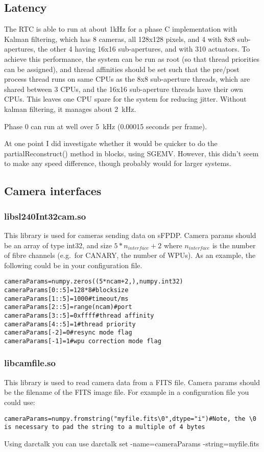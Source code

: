 \documentclass[a4,10pt]{article}
\begin{document}
\subsection{Latency}
The RTC is able to run at about 1kHz for a phase C implementation with
Kalman filtering, which
has 8 cameras, all 128x128 pixels, and 4 with 8x8 sub-apertures, the
other 4 having 16x16 sub-apertures, and with 310 actuators.  To
achieve this performance, the system can be run as root (so that
thread priorities can be assigned), and thread affinities should be
set such that the pre/post process thread runs on same CPUs as the 8x8
sub-aperture threads, which are shared between 3 CPUs, and the 16x16
sub-aperture threads have their own CPUs.  This leaves one CPU spare
for the system for reducing jitter.  Without kalman filtering, it
manages about 2~kHz.

Phase 0 can run at well over 5~kHz (0.00015 seconds per frame).

At one point I did investigate whether it would be quicker to do the
partialReconstruct() method in blocks, using SGEMV.  However, this
didn't seem to make any speed difference, though probably would for larger systems.

\subsection{Camera interfaces}
\subsubsection{libsl240Int32cam.so}
This library is used for cameras sending data on sFPDP.  Camera params
should be an array of type int32, and size $5*n_{interface}+2$ where
$n_{interface}$ is the number of fibre channels (e.g.\ for CANARY, the
number of WPUs).  As an example, the following could be in your
configuration file.
\begin{verbatim}
cameraParams=numpy.zeros((5*ncam+2,),numpy.int32)
cameraParams[0::5]=128*8#blocksize
cameraParams[1::5]=1000#timeout/ms
cameraParams[2::5]=range(ncam)#port
cameraParams[3::5]=0xffff#thread affinity
cameraParams[4::5]=1#thread priority
cameraParams[-2]=0#resync mode flag
cameraParams[-1]=1#wpu correction mode flag
\end{verbatim}

\subsubsection{libcamfile.so}
This library is used to read camera data from a FITS file.
Camera params should be the filename of the FITS image file.
For example in a configuration file you could use:
\begin{verbatim}
cameraParams=numpy.fromstring("myfile.fits\0",dtype="i")#Note, the \0 is necessary to pad the string to a multiple of 4 bytes
\end{verbatim}
Using darctalk you can use darctalk set -name=cameraParams -string=myfile.fits
\end{document}

